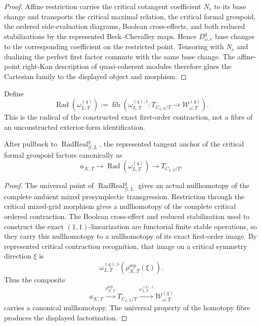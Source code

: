 \begin{proof}
Affine restriction carries the critical cotangent coefficient $N_c$ to its base
change and transports the critical maximal relation, the critical formal groupoid,
the ordered side-evaluation diagrams, Boolean cross-effects, and both reduced
stabilizations by the represented Beck--Chevalley maps.  Hence
$D_{\omega,c}^{q}$ base changes to the corresponding coefficient on the restricted
point.  Tensoring with $N_c$ and dualizing the perfect first factor commute with the
same base change.  The affine-point right-Kan description of quasi-coherent modules
therefore glues the Cartesian family to the displayed object and morphism.
\end{proof}

\begin{definition}
\label{def:symmetry-noether-represented-presymplectic-radical}
Define
\[
\boxed{
\operatorname{Rad}(\omega_{L,T}^{(q)})
:=
\operatorname{fib}
\left(
\omega_{L,T}^{(q),\flat}:
T_{C_{L,T}/T}
\longrightarrow
\mathcal W_{\omega,T}^{(q)}
\right).
}
\]
This is the radical of the constructed exact first-order contraction, not a fibre
of an unconstructed exterior-form identification.
\end{definition}

\begin{theorem}
\label{thm:symmetry-noether-universal-critical-symmetry-radical-factorization}
After pullback to
$\operatorname{RadReal}_{\mathcal G,L}^{q}$, the represented tangent anchor of the
critical formal groupoid factors canonically as
\[
\boxed{
a_{\mathcal K,T}
\longrightarrow
\operatorname{Rad}(\omega_{L,T}^{(q)})
\longrightarrow
T_{C_{L,T}/T}.
}
\]
\end{theorem}

\begin{proof}
The universal point of $\operatorname{RadReal}_{\mathcal G,L}^{q}$ gives an
actual nullhomotopy of the complete ambient mixed presymplectic transgression.
Restriction through the critical mixed-grid morphism gives a nullhomotopy of the
complete critical ordered contraction.  The Boolean cross-effect and reduced
stabilization used to construct the exact $(1,1)$-linearization are functorial
finite stable operations, so they carry this nullhomotopy to a nullhomotopy of its
exact first-order image.  By represented critical contraction recognition, that
image on a critical symmetry direction $\xi$ is
\[
\omega_{L,T}^{(q),\flat}
\left(\rho_{\mathcal K,T}^{\mathrm{rep}}(\xi)\right).
\]
Thus the composite
\[
a_{\mathcal K,T}
\xrightarrow{\rho_{\mathcal K,T}^{\mathrm{rep}}}
T_{C_{L,T}/T}
\xrightarrow{\omega_{L,T}^{(q),\flat}}
\mathcal W_{\omega,T}^{(q)}
\]
carries a canonical nullhomotopy.  The universal property of the homotopy fibre
produces the displayed factorization.
\end{proof}

